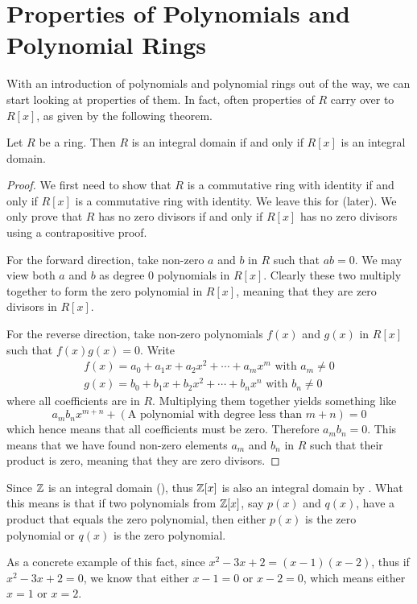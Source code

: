 \section{Properties of Polynomials and Polynomial Rings}
With an introduction of polynomials and polynomial rings out of the way, we can start looking at properties of them. In fact, often properties of $R$ carry over to $R[x]$, as given by the following theorem.

\begin{theorem}\label{thrm-integral-domain-iff-polynomial-ring-is-integral-domain}
    Let $R$ be a ring. Then $R$ is an integral domain if and only if $R[x]$ is an integral domain.
\end{theorem}
\begin{proof}
    We first need to show that $R$ is a commutative ring with identity if and only if $R[x]$ is a commutative ring with identity. We leave this for  (later). We only prove that $R$ has no zero divisors if and only if $R[x]$ has no zero divisors using a contrapositive proof.

    For the forward direction, take non-zero $a$ and $b$ in $R$ such that $ab = 0$. We may view both $a$ and $b$ as degree 0 polynomials in $R[x]$. Clearly these two multiply together to form the zero polynomial in $R[x]$, meaning that they are zero divisors in $R[x]$.

    For the reverse direction, take non-zero polynomials $f(x)$ and $g(x)$ in $R[x]$ such that $f(x)g(x) = 0$. Write
    \begin{align*}
        f(x) = a_0+a_1x+a_2x^2+\cdots+a_mx^m \text{ with } a_m \neq 0\\
        g(x) = b_0+b_1x+b_2x^2+\cdots+b_nx^n \text{ with } b_n \neq 0
    \end{align*}
    where all coefficients are in $R$. Multiplying them together yields something like
    \[
        a_mb_nx^{m+n} + (\text{A polynomial with degree less than }m+n) = 0
    \]
    which hence means that all coefficients must be zero. Therefore $a_mb_n = 0$. This means that we have found non-zero elements $a_m$ and $b_n$ in $R$ such that their product is zero, meaning that they are zero divisors.
\end{proof}

\begin{example}
    Since $\mathbb{Z}$ is an integral domain (), thus $\mathbb{Z}[x]$ is also an integral domain by . What this means is that if two polynomials from $\mathbb{Z}[x]$, say $p(x)$ and $q(x)$, have a product that equals the zero polynomial, then either $p(x)$ is the zero polynomial or $q(x)$ is the zero polynomial.

    As a concrete example of this fact, since $x^2-3x+2 = (x-1)(x-2)$, thus if $x^2-3x+2 = 0$, we know that either $x-1 = 0$ or $x-2 = 0$, which means either $x = 1$ or $x = 2$.
\end{example}

